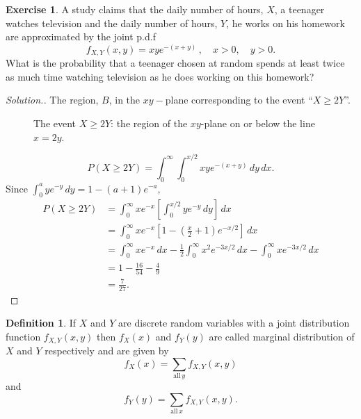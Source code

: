 \documentclass[12pt,a4paper]{report}
\theoremstyle{definition}
\newtheorem{definition}[thm]{Definition}
\newtheorem{exe}[thm]{Exercise}
\theoremstyle{plain}
\theoremstyle{definition}
\begin{document}
\begin{exe}
A study claims that the daily number of hours, $X$, a teenager watches television and the daily number of hours, $Y$, he works on his homework are approximated by the joint p.d.f \[f_{X,Y}(x,y) = xye^{-(x+y)}\, , \quad x > 0, \quad y > 0.\]
What is the probability that a teenager chosen at random spends at least twice as much time watching television as he does working on this homework?
\end{exe}


\begin{proof}[\textit{Solution}.]
The region, $B$, in the $xy-$plane corresponding to the event ``$X \geq 2Y$''.

\begin{figure}[H]
\centering
{}
\caption{The event $X\geq 2Y$: the region of the $xy$-plane on or below the line $x=2y$.}
\end{figure}

\[P(X\geq 2Y) = \int_0^{\infty}\int_0^{x/2} xye^{-(x + y)}\, dy\, dx .\]
Since $\int_0^a ye^{-y}\,dy = 1 - (a + 1)e^{-a}$,
\begin{align*}
P(X\geq 2Y) & = \int^{\infty}_0 xe^{-x}\left[\int^{x/2}_0 y e^{-y}\, dy\right]\, dx\\
& = \int^{\infty}_0xe^{-x}\left[1- \left(\frac{x}{2} + 1\right)e^{-x/2}\right]\, dx\\
& = \int^{\infty}_0 xe^{-x}\, dx - \frac{1}{2}\int_0^{\infty}x^2e^{-3x/2}\, dx - \int^{\infty}_0xe^{-3x/2}\, dx\\
& = 1 - \frac{16}{54}-\frac{4}{9}\\
& = \frac{7}{27}.
\end{align*}
\end{proof}




\begin{definition}
If $X$ and $Y$ are discrete random variables with a joint distribution function $f_{X,Y}(x,y)$ then $f_X(x)$ and $f_Y(y)$ are called marginal distribution of $X$ and $Y$ respectively and are given by \[f_X(x) = \sum_{\text{all}\, y} f_{X,Y}(x,y)\] and \[f_Y(y) = \sum_{\text{all}\, x}f_{X,Y}(x,y).\]
\end{definition}
\end{document}
